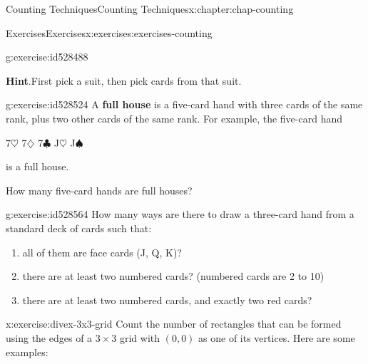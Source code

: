 \documentclass[oneside,10pt,]{book}
\newcommand{\blocktitlefont}{\relax}
\newcommand{\terminology}[1]{\textbf{#1}}
\numberwithin{equation}{section}
\begin{document}
\begin{chapterptx}{Counting Techniques}{}{Counting Techniques}{}{}{x:chapter:chap-counting}
\begin{exercises-section}{Exercises}{}{Exercises}{}{}{x:exercises:exercises-counting}
\begin{divisionexercise}{9}{}{}{g:exercise:id528488}
\begin{enumerate}[label=(\alph*)]
\end{enumerate}
%
\par\smallskip%
\noindent\textbf{\blocktitlefont Hint}.\hypertarget{g:hint:id528523}{}\quad{}First pick a suit, then pick cards from that suit.%
\end{divisionexercise}%
\begin{divisionexercise}{10}{}{}{g:exercise:id528524}%
A \terminology{full house} is a five-card hand with three cards of the same rank, plus two other cards of the same rank. For example, the five-card hand%
\begin{sidebyside}{1}{0.3}{0.3}{0}%
\begin{sbspanel}{0.4}%
7\(\heartsuit\) 7\(\diamondsuit\) 7\(\clubsuit\) J\(\heartsuit\) J\(\spadesuit\)%
\end{sbspanel}%
\end{sidebyside}%
\par
is a full house.%
\par
How many five-card hands are full houses?%
\end{divisionexercise}%
\begin{divisionexercise}{11}{}{}{g:exercise:id528564}%
How many ways are there to draw a three-card hand from a standard deck of cards such that:%
\begin{enumerate}[label=(\alph*)]
\item{}all of them are face cards (J, Q, K)?%
\item{}there are at least two numbered cards? (numbered cards are 2 to 10)%
\item{}there are at least two numbered cards, and exactly two red cards?%
\end{enumerate}
%
\end{divisionexercise}%
\begin{divisionexercise}{12}{}{}{x:exercise:divex-3x3-grid}%
Count the number of rectangles that can be formed using the edges of a \(3 \times 3\) grid with \((0,0)\) as one of its vertices. Here are some examples:%
\begin{sidebyside}{3}{0.0916666666666667}{0.0916666666666667}{0.183333333333333}%
\begin{sbspanel}{0.15}%
%
\end{sbspanel}%

\end{sidebyside}
\end{divisionexercise}
\end{exercises-section}
\end{chapterptx}
\end{document}
